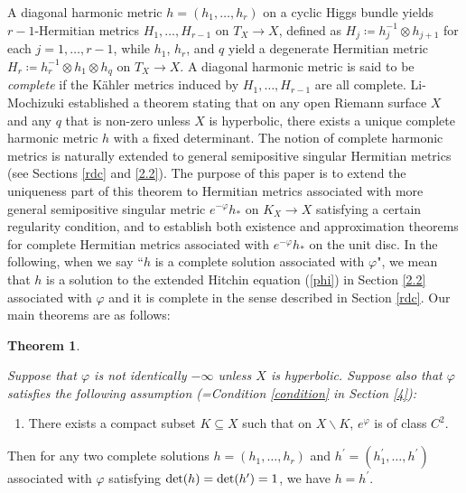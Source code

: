 \documentclass[12pt]{article}
\theoremstyle{definition}
\newtheorem{theo}[defi]{Theorem}
\def\det{{\rm det}}
\def\det{{\rm det}}
\def\refe{\ast}
\begin{document}
A diagonal harmonic metric $h = (h_1, \dots, h_r)$ on a cyclic Higgs bundle yields $r-1$-Hermitian metrics $H_1, \dots, H_{r-1}$ on $T_X\rightarrow X$, defined as $H_j \coloneqq h_j^{-1} \otimes h_{j+1}$ for each $j=1,\dots, r-1$, while $h_1$, $h_r$, and $q$ yield a degenerate Hermitian metric $H_r\coloneqq h_r^{-1}\otimes h_1\otimes h_q$ on $T_X \rightarrow X$. A diagonal harmonic metric is said to be {\it complete} if the K\"ahler metrics induced by $H_1,\dots, H_{r-1}$ are all complete. Li-Mochizuki \cite{LM1} established a theorem stating that on any open Riemann surface $X$ and any $q$ that is non-zero unless $X$ is hyperbolic, there exists a unique complete harmonic metric $h$ with a fixed determinant. The notion of complete harmonic metrics is naturally extended to general semipositive singular Hermitian metrics (see Sections \ref{rdc} and \ref{2.2}). The purpose of this paper is to extend the uniqueness part of this theorem to Hermitian metrics associated with more general semipositive singular metric $e^{-\varphi}h_\refe$ on $K_X\rightarrow X$ satisfying a certain regularity condition, and to establish both existence and approximation theorems for complete Hermitian metrics associated with $e^{-\varphi}h_\refe$ on the unit disc. In the following, when we say ``$h$ is a complete solution associated with $\varphi$", we mean that $h$ is a solution to the extended Hitchin equation (\ref{phi}) in Section \ref{2.2} associated with $\varphi$ and it is complete in the sense described in Section \ref{rdc}. Our main theorems are as follows:

\begin{theo}\label{main theorem 1} {\it Suppose that $\varphi$ is not identically $-\infty$ unless $X$ is hyperbolic. Suppose also that $\varphi$ satisfies the following assumption (=Condition \ref{condition} in Section \ref{4}):
\begin{enumerate}[$(\ast)$]
\item There exists a compact subset $K\subseteq X$ such that on $X\backslash K$, $e^{\varphi}$ is of class $C^2$.
\end{enumerate}
Then for any two complete solutions $h=(h_1,\dots, h_r)$ and $h^\prime=(h_1^\prime,\dots, h^\prime)$ associated with $\varphi$ satisfying $\det(h)=\det(h^\prime)=1$, we have $h=h^\prime$. 
}
\end{theo}
\end{document}
